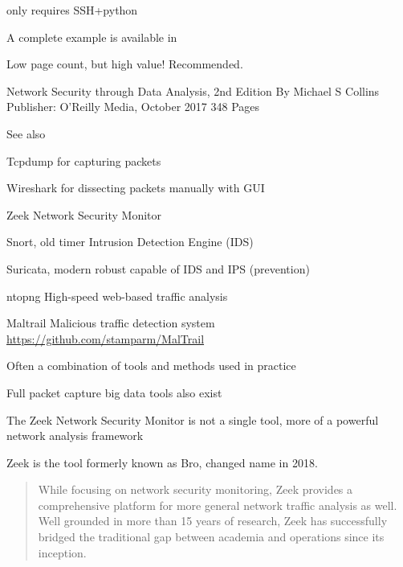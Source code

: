 \documentclass[Screen16to9,17pt]{foils}
\begin{document}
\centerline{only requires SSH+python }

A complete example is available in 



Low page count, but high value! Recommended.

Network Security through Data Analysis, 2nd Edition
By Michael S Collins
Publisher: O'Reilly Media, October 2017 348 Pages

See also 


\begin{list1}
\item Tcpdump for capturing packets
\item Wireshark for dissecting packets manually with GUI
\item Zeek Network Security Monitor
\item Snort, old timer Intrusion Detection Engine (IDS)
\item Suricata, modern robust capable of IDS and IPS (prevention)
\item ntopng High-speed web-based traffic analysis
\item Maltrail Malicious traffic detection system \url{https://github.com/stamparm/MalTrail}
\end{list1}

\vskip 5mm
\centerline{Often a combination of tools and methods used in practice}

Full packet capture big data tools also exist





The Zeek Network Security Monitor is not a single tool, more of a
powerful network analysis framework

Zeek is the tool formerly known as Bro, changed name in 2018. 





\begin{quote}
While focusing on network security monitoring, Zeek provides a comprehensive platform for more general network traffic analysis as well. Well grounded in more than 15 years of research, Zeek has successfully bridged the traditional gap between academia and operations since its inception.
\end{quote}
\end{document}
